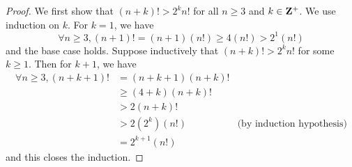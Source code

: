\begin{proof}
    We first show that \((n + k)! > 2^k n!\) for all \(n \geq 3\) and \(k \in \mathbf{Z}^+\).
    We use induction on \(k\).
    For \(k = 1\), we have
    \[
        \forall n \geq 3, (n + 1)! = (n + 1) (n!) \geq 4 (n!) > 2^1 (n!)
    \]
    and the base case holds.
    Suppose inductively that \((n + k)! > 2^k n!\) for some \(k \geq 1\).
    Then for \(k + 1\), we have
    \begin{align*}
        \forall n \geq 3, (n + k + 1)! & = (n + k + 1) (n + k)!                                    \\
                                       & \geq (4 + k)(n + k)!                                      \\
                                       & > 2 (n + k)!                                              \\
                                       & > 2 (2^k) (n!)         & \text{(by induction hypothesis)} \\
                                       & = 2^{k + 1} (n!)
    \end{align*}
    and this closes the induction.


\end{proof}
